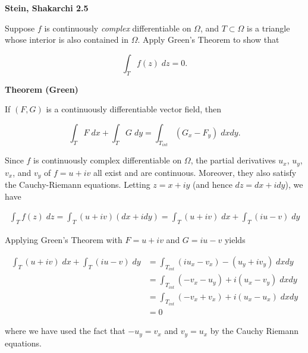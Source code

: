 \textbf{Stein, Shakarchi 2.5}

Suppose $f$ is continuously \textit{complex} differentiable on $\Omega$, and $T \subset \Omega$ is a triangle whose 
interior is also contained in $\Omega$. Apply Green's Theorem to show that

$$
\int_T f(z) \; dz = 0.
$$

\textbf{Theorem (Green)}

If $(F, G)$ is a continuously differentiable vector field, then

$$
\int_{T} F \; dx + \int_{T} G \; dy = \int_{T_{int}} \left(G_x - F_y\right) \; dx dy.
$$

\begin{solution}
    Since $f$ is continuously complex differentiable on $\Omega$, the partial derivatives $u_x$, $u_y$, $v_x$, and $v_y$
    of $f = u + iv$ all exist and are continuous. Moreover, they also satisfy the Cauchy-Riemann equations. Letting 
    $z = x + iy$ (and hence $dz = dx + i dy$), we have

    \begin{align*}
        \int_T f(z) \; dz = \int_T (u + iv)(dx + i dy) = \int_T (u + iv) \; dx  + \int_T (i u - v) \; dy
    \end{align*}

    Applying Green's Theorem with $F = u + iv$ and $G = iu - v$ yields

    \begin{align*}
        \int_T (u + iv) \; dx  + \int_T (i u - v) \; dy &= \int_{T_{int}} ( i u_x - v_x) - (u_y + iv_y) \; dx dy \\
                                                        &= \int_{T_{int}} (- v_x - u_y) + i(u_x - v_y) \; dx dy \\
                                                        &= \int_{T_{int}} (- v_x + v_x) + i(u_x - u_x) \; dx dy \\
                                                        &= 0
    \end{align*}

    where we have used the fact that $-u_y = v_x$ and $v_y = u_x$ by the Cauchy Riemann equations.
    \ \\
\end{solution}